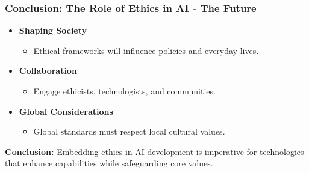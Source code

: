 \documentclass[aspectratio=169]{beamer}
\begin{document}
\begin{frame}[fragile]
    \frametitle{Conclusion: The Role of Ethics in AI - The Future}
    \begin{itemize}
        \item \textbf{Shaping Society}
        \begin{itemize}
            \item Ethical frameworks will influence policies and everyday lives.
        \end{itemize}
        \item \textbf{Collaboration}
        \begin{itemize}
            \item Engage ethicists, technologists, and communities.
        \end{itemize}
        \item \textbf{Global Considerations}
        \begin{itemize}
            \item Global standards must respect local cultural values.
        \end{itemize}
    \end{itemize}
    
    \textbf{Conclusion:} Embedding ethics in AI development is imperative for technologies that enhance capabilities while safeguarding core values.
\end{frame}
\end{document}

